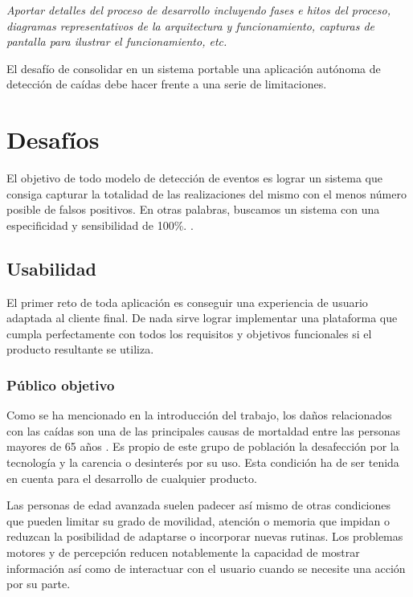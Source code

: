 \documentclass[../tfm.tex]{subfiles}
\begin{document}
\textit{Aportar detalles del proceso de desarrollo incluyendo fases e hitos del proceso, diagramas representativos de la arquitectura y funcionamiento, capturas de pantalla para ilustrar el funcionamiento, etc.}

El desafío de consolidar en un sistema portable una aplicación autónoma de detección de caídas debe hacer frente a una serie de limitaciones.

\section{Desafíos}

El objetivo de todo modelo de detección de eventos es lograr un sistema que consiga capturar la totalidad de las realizaciones del mismo con el menos número posible de falsos positivos. En otras palabras, buscamos un sistema con una especificidad y sensibilidad de 100\%\cite{Noury2007}. .

\subsection{Usabilidad}
El primer reto de toda aplicación es conseguir una experiencia de usuario adaptada al cliente final. De nada sirve lograr implementar una plataforma que cumpla perfectamente con todos los requisitos y objetivos funcionales si el producto resultante se utiliza.

\subsubsection{Público objetivo}
Como se ha mencionado en la introducción del trabajo, los daños relacionados con las caídas son una de las principales causas de mortaldad entre las personas mayores de 65 años . Es propio de este grupo de población la desafección por la tecnología y la carencia o desinterés por su uso. Esta condición ha de ser tenida en cuenta para el desarrollo de cualquier producto.

Las personas de edad avanzada suelen padecer así mismo de otras condiciones que pueden limitar su grado de movilidad, atención o memoria que impidan o reduzcan la posibilidad de adaptarse o incorporar nuevas rutinas. Los problemas motores y de percepción reducen notablemente la capacidad de mostrar información así como de interactuar con el usuario cuando se necesite una acción por su parte.
\end{document}
